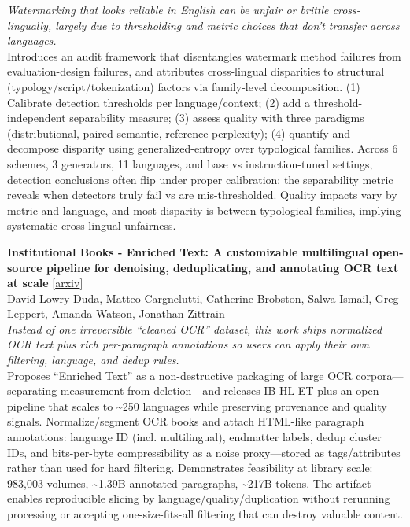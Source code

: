 \documentclass[12pt,letterpaper]{article}
\begin{document}
{\small\textit{Watermarking that looks reliable in English can be unfair or brittle cross-lingually, largely due to thresholding and metric choices that don't transfer across languages.}}\\[1pt]
{\footnotesize Introduces an audit framework that disentangles watermark method failures from evaluation-design failures, and attributes cross-lingual disparities to structural (typology/script/tokenization) factors via family-level decomposition. (1) Calibrate detection thresholds per language/context; (2) add a threshold-independent separability measure; (3) assess quality with three paradigms (distributional, paired semantic, reference-perplexity); (4) quantify and decompose disparity using generalized-entropy over typological families. Across 6 schemes, 3 generators, 11 languages, and base vs instruction-tuned settings, detection conclusions often flip under proper calibration; the separability metric reveals when detectors truly fail vs are mis-thresholded. Quality impacts vary by metric and language, and most disparity is between typological families, implying systematic cross-lingual unfairness.}

\medskip

{\small\textbf{Institutional Books - Enriched Text: A customizable multilingual open-source pipeline for denoising, deduplicating, and annotating OCR text at scale}} {\scriptsize[\href{https://arxiv.org/abs/2608.19026}{arxiv}]}\\
{\scriptsize David Lowry-Duda, Matteo Cargnelutti, Catherine Brobston, Salwa Ismail, Greg Leppert, Amanda Watson, Jonathan Zittrain}\\

{\small\textit{Instead of one irreversible ``cleaned OCR'' dataset, this work ships normalized OCR text plus rich per-paragraph annotations so users can apply their own filtering, language, and dedup rules.}}\\[1pt]
{\footnotesize Proposes ``Enriched Text'' as a non-destructive packaging of large OCR corpora---separating measurement from deletion---and releases IB-HL-ET plus an open pipeline that scales to \textasciitilde{}250 languages while preserving provenance and quality signals. Normalize/segment OCR books and attach HTML-like paragraph annotations: language ID (incl. multilingual), endmatter labels, dedup cluster IDs, and bits-per-byte compressibility as a noise proxy---stored as tags/attributes rather than used for hard filtering. Demonstrates feasibility at library scale: 983,003 volumes, \textasciitilde{}1.39B annotated paragraphs, \textasciitilde{}217B tokens. The artifact enables reproducible slicing by language/quality/duplication without rerunning processing or accepting one-size-fits-all filtering that can destroy valuable content.}
\end{document}
